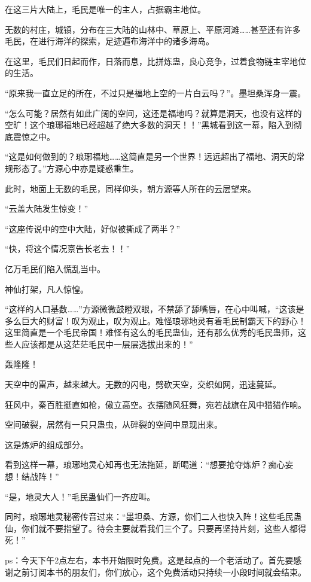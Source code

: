 \begin{this_body}
在这三片大陆上，毛民是唯一的主人，占据霸主地位。

无数的村庄，城镇，分布在三大陆的山林中、草原上、平原河滩……甚至还有许多毛民，在进行海洋的探索，足迹遍布海洋中的诸多海岛。

在这里，毛民们日起而作，日落而息，比拼炼蛊，良心竞争，过着食物链主宰地位的生活。

“原来我一直立足的所在，不过只是福地上空的一片白云吗？”。墨坦桑浑身一震。

“怎么可能？居然有如此广阔的空间，这还是福地吗？就算是洞天，也没有这样的空旷！这个琅琊福地已经超越了绝大多数的洞天！！”黑城看到这一幕，陷入到彻底震惊之中。

“这是如何做到的？琅琊福地……这简直是另一个世界！远远超出了福地、洞天的常规形态了。”方源心中亦是疑惑重生。

此时，地面上无数的毛民，同样仰头，朝方源等人所在的云层望来。

“云盖大陆发生惊变！”

“这座传说中的空中大陆，好似被撕成了两半？”

“快，将这个情况禀告长老去！！”

亿万毛民们陷入慌乱当中。

神仙打架，凡人惊惶。

“这样的人口基数……”方源微微鼓瞪双眼，不禁舔了舔嘴唇，在心中叫喊，“这该是多么巨大的财富！叹为观止，叹为观止。难怪琅琊地灵有着毛民制霸天下的野心！这里简直是一个毛民帝国！难怪有这么的毛民蛊仙，还有那么优秀的毛民蛊师，这些人应该都是从这茫茫毛民中一层层选拔出来的！”

轰隆隆！

天空中的雷声，越来越大。无数的闪电，劈砍天空，交织如网，迅速蔓延。

狂风中，秦百胜挺直如枪，傲立高空。衣摆随风狂舞，宛若战旗在风中猎猎作响。

空间破裂，居然有一只只蛊虫，从碎裂的空间中显现出来。

这是炼炉的组成部分。

看到这样一幕，琅琊地灵心知再也无法拖延，断喝道：“想要抢夺炼炉？痴心妄想！结战阵！”

“是，地灵大人！”毛民蛊仙们一齐应叫。

同时，琅琊地灵秘密传音过来：“墨坦桑、方源，你们二人也快入阵！这些毛民蛊仙，你们就不要指望了。待会主要就看我们三个了。只要再坚持片刻，这些人都得死！”

ps：今天下午2点左右，本书开始限时免费。这是起点的一个老活动了。首先要感谢之前订阅本书的朋友们，你们放心，这个免费活动只持续一小段时间就会结束。

\end{this_body}

